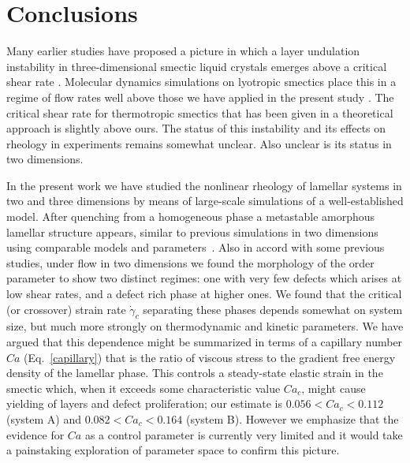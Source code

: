 \documentclass[8.5pt,twoside,twocolumn]{article}
\begin{document}
\section{Conclusions}\label{conclusions}

Many earlier studies have proposed a picture in which a layer undulation instability in three-dimensional smectic liquid crystals emerges above a critical shear rate \cite{Zilman99,Courbin02,Gonnella98,Kumaran2001,Ramaswamy92}. Molecular dynamics simulations on lyotropic smectics place this in a regime of flow rates well above those we have applied in the present study \cite{Guo2002,Soddemann2004}. The critical shear rate for thermotropic smectics that has been given in a theoretical approach \cite{Stewart2009} is slightly above ours. The status of this instability and its effects on rheology in experiments remains somewhat unclear. Also unclear is its status in two dimensions.

In the present work we have studied the nonlinear rheology of lamellar systems in two and three dimensions by means of large-scale simulations of a well-established model. After quenching from a homogeneous phase a metastable amorphous lamellar structure appears, similar to previous simulations in two dimensions using comparable models and parameters~\cite{Gonnella97,Gonnella98,Xu03,Xu05,Xu06a,Xu06b}.
Also in accord with some previous studies, under flow in two dimensions we found the morphology of the order parameter to show two distinct regimes: one with very few defects which arises at low shear rates, and a defect rich phase at higher ones. We found that the critical (or crossover) strain rate $\dot\gamma_c$ separating these phases depends somewhat on system size, but much more strongly on thermodynamic and kinetic parameters. We have argued that this dependence might be summarized in terms of a capillary number $Ca$ (Eq.~\ref{capillary}) that is the ratio of viscous stress to the gradient free energy density of the lamellar phase. This controls a steady-state elastic strain in the smectic which, when it exceeds some characteristic value $Ca_c$, might cause yielding of layers and defect proliferation; our estimate is $0.056<Ca_c<0.112$ (system A) and $0.082<Ca_c<0.164$ (system B). However we emphasize that the evidence for $Ca$ as a control parameter is currently very limited and it would take a painstaking exploration of parameter space to confirm this picture. 
\end{document}
